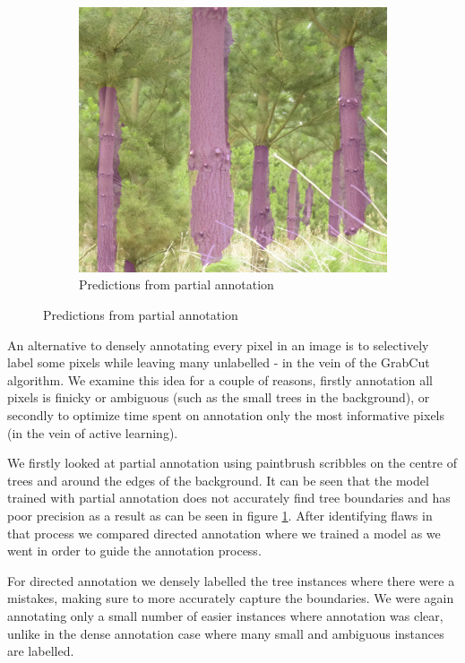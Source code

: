 \documentclass{article}
\begin{document}
\begin{figure}[h!]
\begin{subfigure}[t]{.3\textwidth}
\end{subfigure}%
\begin{subfigure}[t]{.3\textwidth}
  \centering
  \includegraphics[width=0.8\linewidth]{images/loose_predictions.png}
  \caption{Predictions from partial annotation}
  \label{fig:loose_pred}
\end{subfigure}%
\label{fig:partial}
\end{figure}



An alternative to densely annotating every pixel in an image is to selectively label some pixels while leaving many unlabelled - in the vein of the GrabCut algorithm. We examine this idea for a couple of reasons, firstly annotation all pixels is finicky or ambiguous (such as the small trees in the background), or secondly to optimize time spent on annotation only the most informative pixels (in the vein of active learning).

We firstly looked at partial annotation using paintbrush scribbles on the centre of trees and around the edges of the background. It can be seen that the model trained with partial annotation does not accurately find tree boundaries and has poor precision as a result as can be seen in figure \ref{fig:loose_pred}. After identifying flaws in that process we compared directed annotation where we trained a model as we went in order to guide the annotation process.

For directed annotation we densely labelled the tree instances where there were a mistakes, making sure to more accurately capture the boundaries. We were again annotating only a small number of easier instances where annotation was clear, unlike in the dense annotation case where many small and ambiguous instances are labelled.
\end{document}
